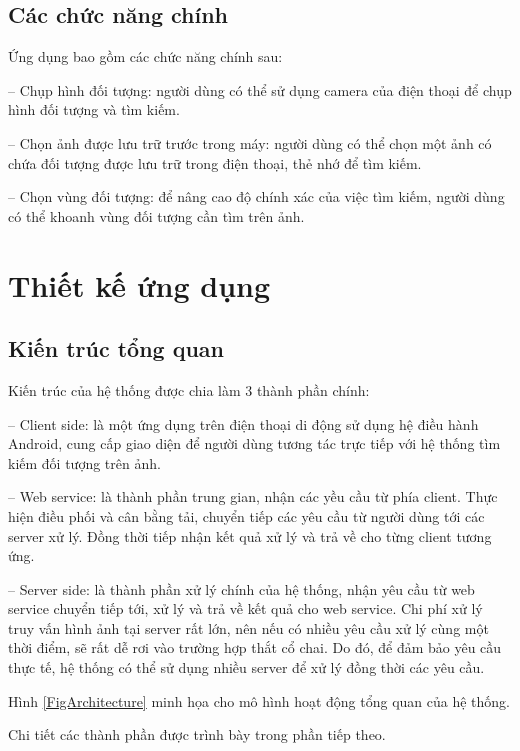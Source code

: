 	\subsection{Các chức năng chính}
Ứng dụng bao gồm các chức năng chính sau:

-- Chụp hình đối tượng: người dùng có thể sử dụng camera của điện thoại để chụp hình đối tượng và tìm kiếm.

-- Chọn ảnh được lưu trữ trước trong máy: người dùng có thể chọn một ảnh có chứa đối tượng được lưu trữ trong điện thoại, thẻ nhớ để tìm kiếm.

-- Chọn vùng đối tượng: để nâng cao độ chính xác của việc tìm kiếm, người dùng có thể khoanh vùng đối tượng cần tìm trên ảnh.

\section{Thiết kế ứng dụng}
\label{c5-thietke}

	\subsection{Kiến trúc tổng quan}
Kiến trúc của hệ thống được chia làm 3 thành phần chính:

-- Client side: là một ứng dụng trên điện thoại di động sử dụng hệ điều hành Android, cung cấp giao diện để người dùng tương tác trực tiếp với hệ thống tìm kiếm đối tượng trên ảnh.

-- Web service: là thành phần trung gian, nhận các yều cầu từ phía client. Thực hiện điều phối và cân bằng tải, chuyển tiếp các yêu cầu từ người dùng tới các server xử lý. Đồng thời tiếp nhận kết quả xử lý và trả về cho từng client tương ứng.

-- Server side: là thành phần xử lý chính của hệ thống, nhận yêu cầu từ web service chuyển tiếp tới, xử lý và trả về kết quả cho web service. Chi phí xử lý truy vấn hình ảnh tại server rất lớn, nên nếu có nhiều yêu cầu xử lý cùng một thời điểm, sẽ rất dễ rơi vào trường hợp thắt cổ chai. Do đó, để đảm bảo yêu cầu thực tế, hệ thống có thể sử dụng nhiều server để xử lý đồng thời các yêu cầu.

Hình \ref{FigArchitecture} minh họa cho mô hình hoạt động tổng quan của hệ thống.

Chi tiết các thành phần được trình bày trong phần tiếp theo.

